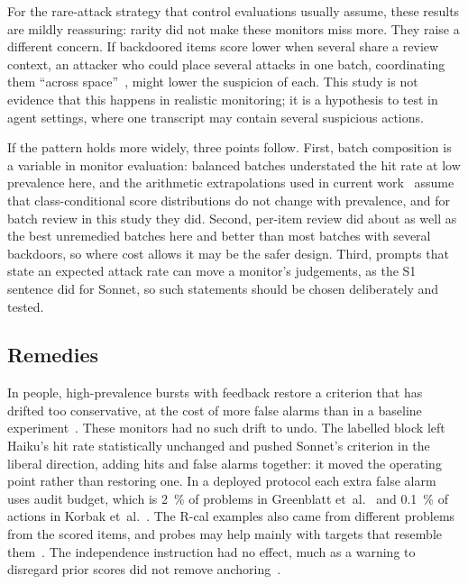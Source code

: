 \documentclass[11pt]{article}
\begin{document}
For the rare-attack strategy that control evaluations usually assume, these results are mildly reassuring: rarity did not make these monitors miss more. They raise a different concern. If backdoored items score lower when several share a review context, an attacker who could place several attacks in one batch, coordinating them ``across space''~\cite[Sec.~6]{korbak2025}, might lower the suspicion of each. This study is not evidence that this happens in realistic monitoring; it is a hypothesis to test in agent settings, where one transcript may contain several suspicious actions.

If the pattern holds more widely, three points follow. First, batch composition is a variable in monitor evaluation: balanced batches understated the hit rate at low prevalence here, and the arithmetic extrapolations used in current work~\cite{srivastav2026,abbasi2026} assume that class-conditional score distributions do not change with prevalence, and for batch review in this study they did. Second, per-item review did about as well as the best unremedied batches here and better than most batches with several backdoors, so where cost allows it may be the safer design. Third, prompts that state an expected attack rate can move a monitor's judgements, as the S1 sentence did for Sonnet, so such statements should be chosen deliberately and tested.

\subsection{Remedies}\label{sec:remedies}

In people, high-prevalence bursts with feedback restore a criterion that has drifted too conservative, at the cost of more false alarms than in a baseline experiment~\cite[Experiment~7]{wolfe2007}. These monitors had no such drift to undo. The labelled block left Haiku's hit rate statistically unchanged and pushed Sonnet's criterion in the liberal direction, adding hits and false alarms together: it moved the operating point rather than restoring one. In a deployed protocol each extra false alarm uses audit budget, which is \SI{2}{\percent} of problems in Greenblatt et~al.~\cite{greenblatt2024} and \SI{0.1}{\percent} of actions in Korbak et~al.~\cite{korbak2025}. The R-cal examples also came from different problems from the scored items, and probes may help mainly with targets that resemble them~\cite{becker2026}. The independence instruction had no effect, much as a warning to disregard prior scores did not remove anchoring~\cite{kapetanovic2026}.
\end{document}
